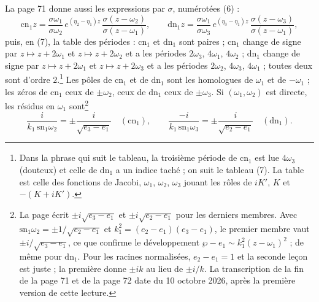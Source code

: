 \documentclass[11pt,a4paper]{article}
\begin{document}
La page 71 donne aussi les expressions par $\sigma$, numérotées (6) :
\[
\mathrm{cn}_1 z = \frac{\sigma\omega_1}{\sigma\omega_2}\,e^{(\eta_2-\eta_1)z}\,
\frac{\sigma(z-\omega_2)}{\sigma(z-\omega_1)},
\qquad
\mathrm{dn}_1 z = \frac{\sigma\omega_1}{\sigma\omega_3}\,e^{(\eta_3-\eta_1)z}\,
\frac{\sigma(z-\omega_3)}{\sigma(z-\omega_1)},
\]
puis, en (7), la table des périodes : $\mathrm{cn}_1$ et $\mathrm{dn}_1$ sont
paires ; $\mathrm{cn}_1$ change de signe par $z \mapsto z + 2\omega_1$ et
$z \mapsto z + 2\omega_2$ et a les périodes $2\omega_3$, $4\omega_1$,
$4\omega_2$ ; $\mathrm{dn}_1$ change de signe par $z \mapsto z + 2\omega_1$ et
$z \mapsto z + 2\omega_3$ et a les périodes $2\omega_2$, $4\omega_3$,
$4\omega_1$ ; toutes deux sont d'ordre $2$.\footnote{Dans la phrase qui suit
le tableau, la troisième période de $\mathrm{cn}_1$ est lue $4\omega_3$
(douteux) et celle de $\mathrm{dn}_1$ a un indice taché ; on suit le tableau
(7). La table est celle des fonctions de Jacobi, $\omega_1$, $\omega_2$,
$\omega_3$ jouant les rôles de $iK'$, $K$ et $-(K + iK')$.} Les pôles de
$\mathrm{cn}_1$ et de $\mathrm{dn}_1$ sont les homologues de $\omega_1$ et de
$-\omega_1$ ; les zéros de $\mathrm{cn}_1$ ceux de $\pm\omega_2$, ceux de
$\mathrm{dn}_1$ ceux de $\pm\omega_3$. Si $(\omega_1, \omega_2)$ est
directe, les résidus en $\omega_1$ sont\footnote{La page écrit $\pm i\sqrt{e_3 - e_1}$ et $\pm i\sqrt{e_2 - e_1}$
pour les derniers membres. Avec $\mathrm{sn}_1\omega_2 = \pm 1/\sqrt{e_2 -
e_1}$ et $k_1^2 = (e_2 - e_1)(e_3 - e_1)$, le premier membre vaut $\pm
i/\sqrt{e_3 - e_1}$, ce que confirme le développement $\wp - e_1 \sim
k_1^2 (z - \omega_1)^2$ ; de même pour $\mathrm{dn}_1$. Pour les racines
normalisées, $e_2 - e_1 = 1$ et la seconde leçon est juste ; la première
donne $\pm ik$ au lieu de $\pm i/k$. La transcription de la fin de la page 71
et de la page 72 date du 10 octobre 2026, après la première version de cette
lecture.}
\[
\frac{i}{k_1\,\mathrm{sn}_1\omega_2} = \pm\frac{i}{\sqrt{e_3 - e_1}}
\quad (\mathrm{cn}_1),
\qquad
\frac{-i}{k_1\,\mathrm{sn}_1\omega_3} = \pm\frac{i}{\sqrt{e_2 - e_1}}
\quad (\mathrm{dn}_1).
\]
\end{document}
